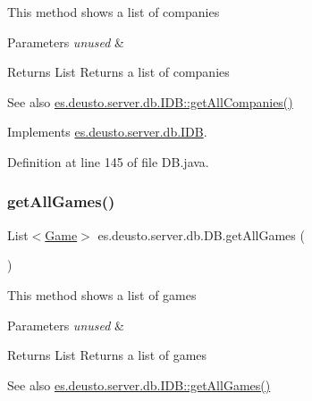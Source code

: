 This method shows a list of companies 
\begin{DoxyParams}{Parameters}
{\em unused} & \\
\hline
\end{DoxyParams}
\begin{DoxyReturn}{Returns}
List Returns a list of companies 
\end{DoxyReturn}
\begin{DoxySeeAlso}{See also}
\hyperlink{interfacees_1_1deusto_1_1server_1_1db_1_1_i_d_b_af7500b1f7c74d658837ed1a5ec82ebec}{es.\+deusto.\+server.\+db.\+I\+D\+B\+::get\+All\+Companies()} 
\end{DoxySeeAlso}


Implements \hyperlink{interfacees_1_1deusto_1_1server_1_1db_1_1_i_d_b_af7500b1f7c74d658837ed1a5ec82ebec}{es.\+deusto.\+server.\+db.\+I\+DB}.



Definition at line 145 of file D\+B.\+java.

\mbox{\label{classes_1_1deusto_1_1server_1_1db_1_1_d_b_ad878c1c58062596b5e1b582ed496bd11}} 
\subsubsection{\texorpdfstring{get\+All\+Games()}{getAllGames()}}
{\footnotesize\ttfamily List$<$\hyperlink{classes_1_1deusto_1_1server_1_1db_1_1data_1_1_game}{Game}$>$ es.\+deusto.\+server.\+db.\+D\+B.\+get\+All\+Games (\begin{DoxyParamCaption}{ }\end{DoxyParamCaption})}

This method shows a list of games 
\begin{DoxyParams}{Parameters}
{\em unused} & \\
\hline
\end{DoxyParams}
\begin{DoxyReturn}{Returns}
List Returns a list of games 
\end{DoxyReturn}
\begin{DoxySeeAlso}{See also}
\hyperlink{interfacees_1_1deusto_1_1server_1_1db_1_1_i_d_b_a76af81d4bb71c81490da92d67c5b6d03}{es.\+deusto.\+server.\+db.\+I\+D\+B\+::get\+All\+Games()} 
\end{DoxySeeAlso}


